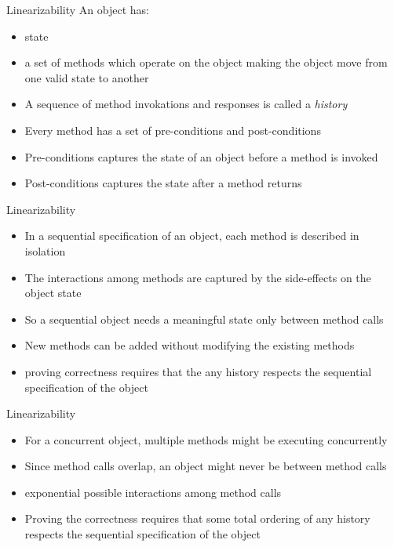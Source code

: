 \ifdefined\LONG
\begin{frame}{Linearizability}
An object has:
\begin{itemize}
\item state
\item a set of methods which operate on the object making the object move from one valid state to another
\end{itemize}
\begin{itemize}
\item A sequence of method invokations and responses is called a \emph{history}
\item Every method has a set of pre-conditions and post-conditions
\item Pre-conditions captures the state of an object before a method is invoked
\item Post-conditions captures the state after a method returns
\end{itemize}
\end{frame}

\begin{frame}{Linearizability}
\begin{itemize}
\item In a sequential specification of an object, each method is described in isolation
\item The interactions among methods are captured by the side-effects on the object state
\item So a sequential object needs a meaningful state only between method calls
\item New methods can be added without modifying the existing methods
\item proving correctness requires that the any history respects the sequential specification of the object
\end{itemize}
\end{frame}

\begin{frame}{Linearizability}
\begin{itemize}
\item For a concurrent object, multiple methods might be executing concurrently
\item Since method calls overlap, an object might never be between method calls
\item exponential possible interactions among method calls
\item Proving the correctness requires that some total ordering of any history respects the sequential specification of the object
\end{itemize}
\end{frame}

